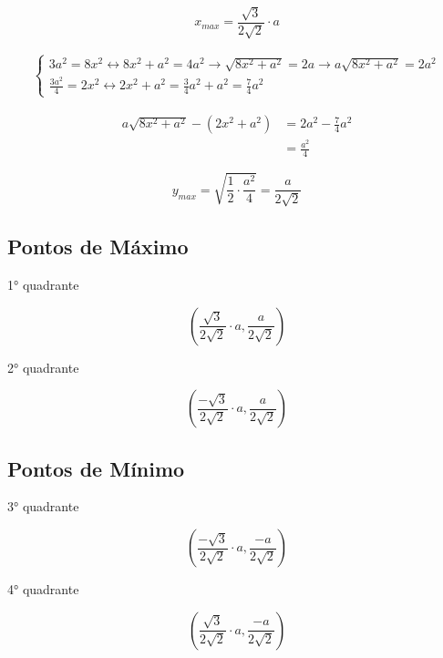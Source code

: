 \documentclass[../resumo.tex]{subfiles}
\begin{document}
	\newpage

	\[x_{max} = \frac{\sqrt{3}}{2 \sqrt{2}} \cdot a\]

	\begin{align*}
		\begin{cases}
			3a^2 = 8x^2 \longleftrightarrow 8x^2 + a^2 = 4a^2 \rightarrow \sqrt{8x^2 + a^2} = 2a \rightarrow a \sqrt{8x^2 + a^2} = 2a^2 \\
			\frac{3a^2}{4} = 2x^2 \longleftrightarrow 2x^2 + a^2 = \frac{3}{4} a^2 + a^2 = \frac{7}{4} a^2
		\end{cases}
	\end{align*}

	\begin{align*}
		a \sqrt{8x^2 + a^2} - (2x^2 + a^2) &= 2a^2 - \frac{7}{4} a^2 \\
		&= \frac{a^2}{4}
	\end{align*}

	\[ y_{max} = \sqrt{\frac{1}{2} \cdot \frac{a^2}{4}} = \frac{a}{2 \sqrt{2}} \]

	\subsection{Pontos de Máximo}

	1° quadrante

	\[ \left( \frac{\sqrt{3}}{2\sqrt{2}} \cdot a, \frac{a}{2 \sqrt{2}} \right) \]

	2° quadrante

	\[ \left( \frac{-\sqrt{3}}{2\sqrt{2}} \cdot a, \frac{a}{2 \sqrt{2}} \right) \]

	\subsection{Pontos de Mínimo}

	3° quadrante

	\[ \left( \frac{-\sqrt{3}}{2\sqrt{2}} \cdot a, \frac{-a}{2 \sqrt{2}} \right) \]

	4° quadrante

	\[ \left( \frac{\sqrt{3}}{2\sqrt{2}} \cdot a, \frac{-a}{2 \sqrt{2}} \right) \]
\end{document}

